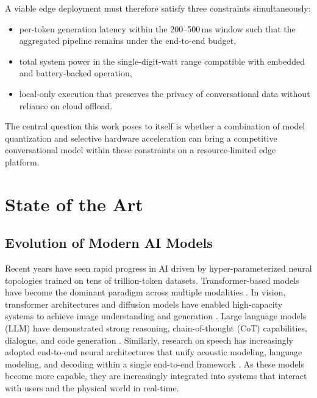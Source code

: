 \documentclass[manuscript,]{acmart} %
\begin{document}
A viable edge deployment must therefore satisfy three constraints simultaneously:
\begin{itemize}[label=(\roman*)]
    \item per-token generation latency within the 200--500\,ms window such that the aggregated pipeline remains under the end-to-end budget,
    \item total system power in the single-digit-watt range compatible with embedded and battery-backed operation,
    \item local-only execution that preserves the privacy of conversational data without reliance on cloud offload.
\end{itemize}

The central question this work poses to itself is whether a combination of model quantization and selective
hardware acceleration can bring a competitive conversational model within these
constraints on a resource-limited edge platform.

\section{State of the Art} \label{sec:sota}

\subsection{Evolution of Modern AI Models}
Recent years have seen rapid progress in AI driven by hyper-parameterized neural topologies trained on tens of trillion-token datasets. Transformer-based models have become the dominant paradigm across multiple modalities \cite{10433480}.
In vision, transformer architectures and diffusion models have enabled high-capacity systems to achieve image understanding and generation \cite{10902142}. Large language models (LLM) have demonstrated strong reasoning, chain-of-thought (CoT) capabilities, dialogue, and code generation \cite{10.1145-3747588}. Similarly, research on speech has increasingly adopted end-to-end neural architectures that unify acoustic modeling, language modeling, and decoding within a single end-to-end framework \cite{app142411583}.
As these models become more capable, they are increasingly integrated into systems that interact with users and the physical world in real-time. 
\end{document}
